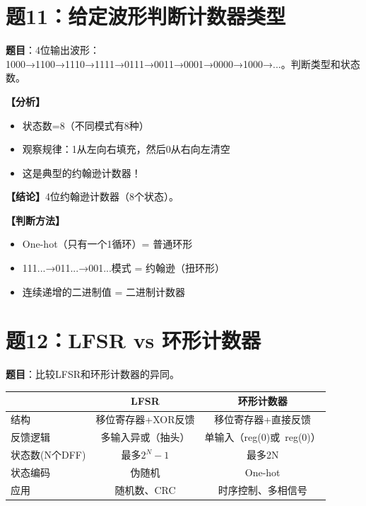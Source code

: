 \section{题11：给定波形判断计数器类型}

\textbf{题目}：4位输出波形：1000→1100→1110→1111→0111→0011→0001→0000→1000→...。判断类型和状态数。

\begin{solution}[完整解答]

\textbf{【分析】}
\begin{itemize}
  \item 状态数=8（不同模式有8种）
  \item 观察规律：1从左向右填充，然后0从右向左清空
  \item 这是典型的约翰逊计数器！
\end{itemize}

\textbf{【结论】}4位约翰逊计数器（8个状态）。

\textbf{【判断方法】}
\begin{itemize}
  \item One-hot（只有一个1循环）= 普通环形
  \item 111...→011...→001...模式 = 约翰逊（扭环形）
  \item 连续递增的二进制值 = 二进制计数器
\end{itemize}

\end{solution}


\section{题12：LFSR vs 环形计数器}

\textbf{题目}：比较LFSR和环形计数器的异同。

\begin{solution}[完整解答]

\begin{center}
\begin{tabular}{|l|c|c|}\hline
 & LFSR & 环形计数器 \\ \hline
结构 & 移位寄存器+XOR反馈 & 移位寄存器+直接反馈 \\
反馈逻辑 & 多输入异或（抽头）& 单输入（reg(0)或~reg(0)）\\
状态数(N个DFF) & 最多$2^N-1$ & 最多2N \\
状态编码 & 伪随机 & One-hot \\
应用 & 随机数、CRC & 时序控制、多相信号 \\
\hline
\end{tabular}
\end{center}

\end{solution}


